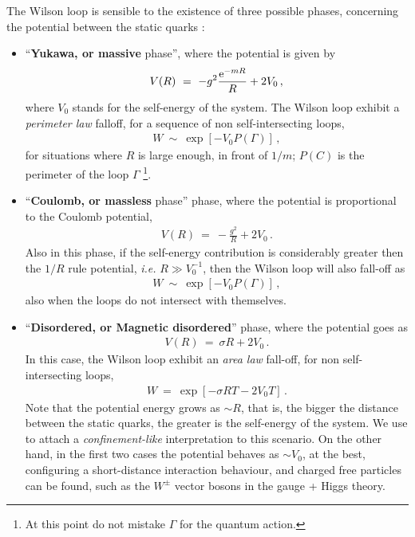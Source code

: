 The Wilson loop is sensible to the existence of three possible phases, concerning the potential
between the static quarks \cite{Greensite:2011zz}:
\begin{itemize}
\item ``{\bf Yukawa, or massive} phase'', where the potential is given by
\begin{eqnarray}
V(R) ~=~ -g^{2}\frac{\mathrm{e}^{-mR}}{R} + 2V_{0}\,,
\label{perimeterlaw}
\end{eqnarray}
where $V_{0}$ stands for the self-energy of the system. The Wilson loop exhibit a
\emph{perimeter law} falloff, for a sequence of non self-intersecting loops,
\begin{eqnarray}
W  ~\sim~ \exp [-V_{0}P(\Gamma)]\,,
\end{eqnarray}
for situations where $R$ is large enough, in front of $1/m$; $P(C)$ is the perimeter of the
loop $\Gamma$ \footnote{At this point do not mistake $\Gamma$ for the quantum action.}.

\item ``{\bf Coulomb, or massless} phase'' phase, where the potential is proportional to the Coulomb
potential,
\begin{eqnarray}
V(R) ~=~ -\frac{g^{2}}{R} + 2V_{0}\,.
\end{eqnarray}
Also in this phase, if the self-energy contribution is considerably greater then the $1/R$ rule
potential, \emph{i.e.} $R\gg V^{-1}_{0}$, then the Wilson loop will also fall-off as 
\begin{eqnarray}
W  ~\sim~ \exp [-V_{0}P(\Gamma)]\,,
\end{eqnarray}
also when the loops do not intersect with themselves.

\item ``{\bf Disordered, or Magnetic disordered}'' phase, where the potential goes as
\begin{eqnarray}
V(R) ~=~ \sigma R + 2V_{0}\,.
\end{eqnarray}
In this case, the Wilson loop exhibit an \emph{area law} fall-off, for non self-intersecting
loops,
\begin{eqnarray}
W ~=~ \exp[ -\sigma RT - 2V_{0}T]\,.
\end{eqnarray}
Note that the potential energy grows as $\sim R$, that is, the bigger the distance between the
static quarks, the greater is the self-energy of the system. We use to attach a
\emph{confinement-like} interpretation to this scenario. On the other hand, in the first two
cases the potential behaves as $\sim V_{0}$, at the best, configuring a short-distance
interaction behaviour, and charged free particles can be found, such as the $W^{\pm}$ vector
bosons in the gauge + Higgs theory.


\end{itemize}
